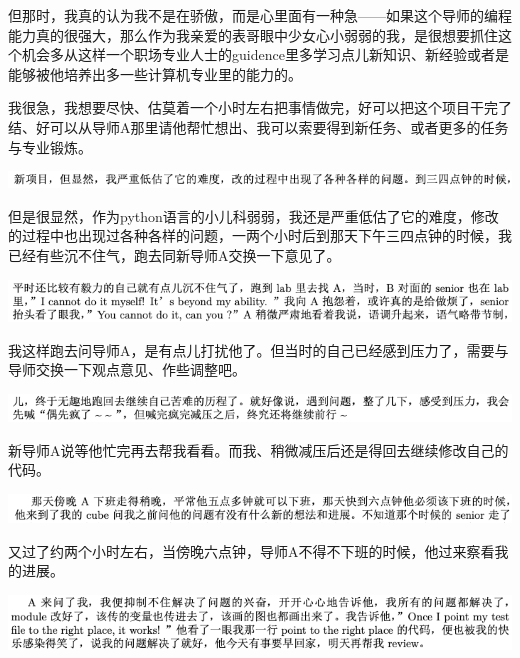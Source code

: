 \documentclass[9pt, b5paper]{article}
\begin{document}
但那时，我真的认为我不是在骄傲，而是心里面有一种急——如果这个导师的编程能力真的很强大，那么作为我亲爱的表哥眼中少女心小弱弱的我，是很想要抓住这个机会多从这样一个职场专业人士的guidence里多学习点儿新知识、新经验或者是能够被他培养出多一些计算机专业里的能力的。

我很急，我想要尽快、估莫着一个小时左右把事情做完，好可以把这个项目干完了结、好可以从导师A那里请他帮忙想出、我可以索要得到新任务、或者更多的任务与专业锻炼。 

\begin{center}
\includegraphics[width=.9\linewidth]{./pic/backups_plans_20210511_111704.png}
\end{center}

但是很显然，作为python语言的小儿科弱弱，我还是严重低估了它的难度，修改的过程中也出现过各种各样的问题，一两个小时后到那天下午三四点钟的时候，我已经有些沉不住气，跑去同新导师A交换一下意见了。 

\begin{center}
\includegraphics[width=.9\linewidth]{./pic/backups_plans_20210511_111728.png}
\end{center}

我这样跑去问导师A，是有点儿打扰他了。但当时的自己已经感到压力了，需要与导师交换一下观点意见、作些调整吧。

\begin{center}
\includegraphics[width=.9\linewidth]{./pic/backups_plans_20210511_112426.png}
\end{center}

新导师A说等他忙完再去帮我看看。而我、稍微减压后还是得回去继续修改自己的代码。 

\begin{center}
\includegraphics[width=.9\linewidth]{./pic/backups_plans_20210511_112554.png}
\end{center}

又过了约两个小时左右，当傍晚六点钟，导师A不得不下班的时候，他过来察看我的进展。 

\begin{center}
\includegraphics[width=.9\linewidth]{./pic/backups_plans_20210511_112718.png}
\end{center}
\end{document}
